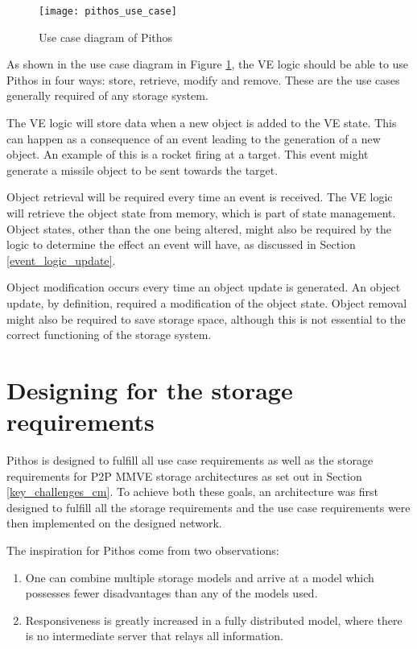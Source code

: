 \begin{figure}[htbp]
 \centering
 \texttt{[image: pithos\_use\_case]}
 \caption{Use case diagram of Pithos}
 \label{fig_pithos_use_case}
\end{figure}

As shown in the use case diagram in Figure \ref{fig_pithos_use_case}, the VE logic should be able to use Pithos in four ways: store, retrieve, modify and remove. These are the use cases generally required of any storage system.

The VE logic will store data when a new object is added to the VE state. This can happen as a consequence of an event leading to the generation of a new object. An example of this is a rocket firing at a target. This event might generate a missile object to be sent towards the target.

Object retrieval will be required every time an event is received. The VE logic will retrieve the object state from memory, which is part of state management. Object states, other than the one being altered, might also be required by the logic to determine the effect an event will have, as discussed in Section \ref{event_logic_update}.

Object modification occurs every time an object update is generated. An object update, by definition, required a modification of the object state. Object removal might also be required to save storage space, although this is not essential to the correct functioning of the storage system.

\section{Designing for the storage requirements}

Pithos is designed to fulfill all use case requirements as well as the storage requirements for P2P MMVE storage architectures as set out in Section \ref{key_challenges_cm}. To achieve both these goals, an architecture was first designed to fulfill all the storage requirements and the use case requirements were then implemented on the designed network.

The inspiration for Pithos come from two observations:
%
\begin{enumerate}
  \item One can combine multiple storage models and arrive at a model which possesses fewer disadvantages than any of the models used.
  \item Responsiveness is greatly increased in a fully distributed model, where there is no intermediate server that relays all information.
\end{enumerate}


